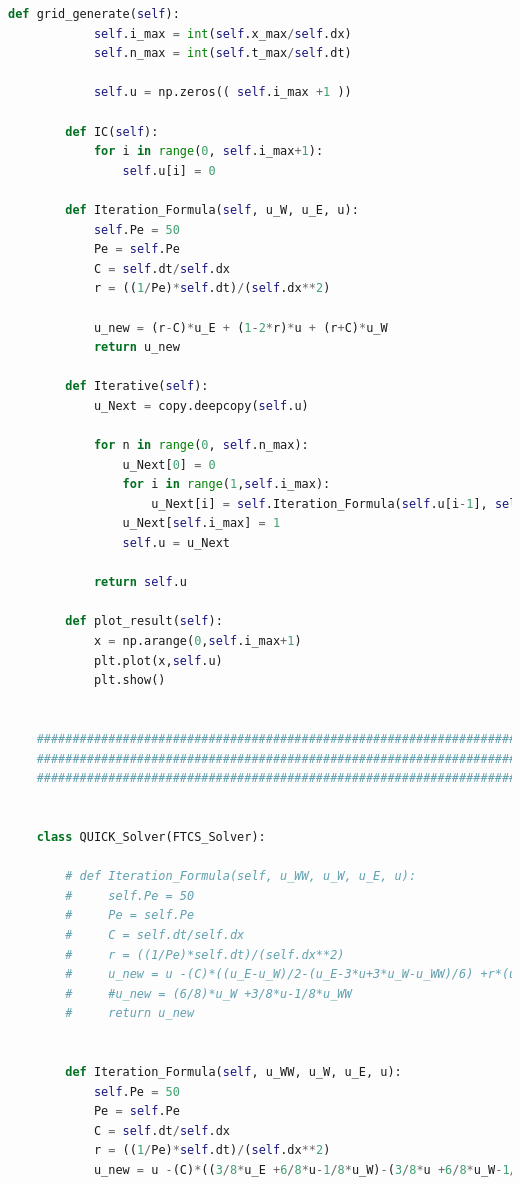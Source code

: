 \documentclass[12pt]{article}
\begin{document}
\begin{scriptsize}
\begin{lstlisting}[language=python,caption={Problem2, QUICK Solver updated}]
        def grid_generate(self):
            self.i_max = int(self.x_max/self.dx)
            self.n_max = int(self.t_max/self.dt)
    
            self.u = np.zeros(( self.i_max +1 ))
    
        def IC(self):
            for i in range(0, self.i_max+1):
                self.u[i] = 0
    
        def Iteration_Formula(self, u_W, u_E, u):
            self.Pe = 50
            Pe = self.Pe
            C = self.dt/self.dx
            r = ((1/Pe)*self.dt)/(self.dx**2)
    
            u_new = (r-C)*u_E + (1-2*r)*u + (r+C)*u_W
            return u_new
    
        def Iterative(self):
            u_Next = copy.deepcopy(self.u)
    
            for n in range(0, self.n_max):
                u_Next[0] = 0
                for i in range(1,self.i_max):
                    u_Next[i] = self.Iteration_Formula(self.u[i-1], self.u[i+1], self.u[i])
                u_Next[self.i_max] = 1
                self.u = u_Next
    
            return self.u
        
        def plot_result(self):
            x = np.arange(0,self.i_max+1)
            plt.plot(x,self.u)
            plt.show()
    
    
    ###############################################################################################
    ###############################################################################################
    ###############################################################################################
    
    
    class QUICK_Solver(FTCS_Solver):
        
        # def Iteration_Formula(self, u_WW, u_W, u_E, u):
        #     self.Pe = 50
        #     Pe = self.Pe
        #     C = self.dt/self.dx
        #     r = ((1/Pe)*self.dt)/(self.dx**2)
        #     u_new = u -(C)*((u_E-u_W)/2-(u_E-3*u+3*u_W-u_WW)/6) +r*(u_W -2*u +u_E)
        #     #u_new = (6/8)*u_W +3/8*u-1/8*u_WW
        #     return u_new
    
    
        def Iteration_Formula(self, u_WW, u_W, u_E, u):
            self.Pe = 50
            Pe = self.Pe
            C = self.dt/self.dx
            r = ((1/Pe)*self.dt)/(self.dx**2)
            u_new = u -(C)*((3/8*u_E +6/8*u-1/8*u_W)-(3/8*u +6/8*u_W-1/8*u_WW)) +r*(u_W -2*u +u_E)
    

\end{lstlisting}
\end{scriptsize}
\end{document}
